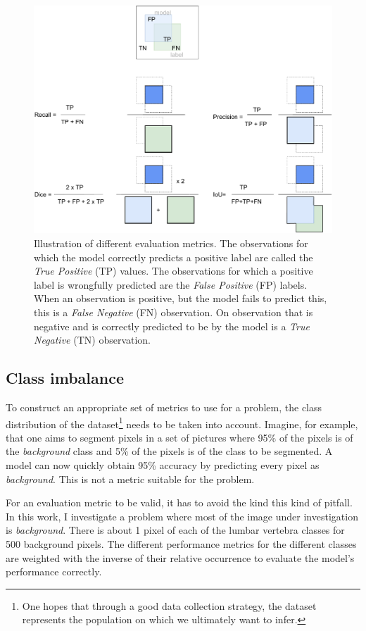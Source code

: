 \begin{figure}
    \centering
    \includegraphics[width=.95\textwidth]{images/Metrics.pdf}
    \caption{Illustration of different evaluation metrics. 
    The observations for which the model correctly predicts a positive label are called the \textit{True Positive} (TP) values.
    The observations for which a positive label is wrongfully predicted are the \textit{False Positive} (FP) labels. 
    When an observation is positive, but the model fails to predict this, this is a \textit{False Negative} (FN) observation.
    On observation that is negative and is correctly predicted to be by the model is a \textit{True Negative} (TN) observation.\label{fig:metrics}
    }
\end{figure}

\subsection{Class imbalance\label{sec:class_imbalance}}
\par{
    To construct an appropriate set of metrics to use for a problem, the class distribution of the dataset\footnote{
        One hopes that through a good data collection strategy, the dataset represents the population on which we ultimately want to infer.
        } needs to be taken into account.
    Imagine, for example, that one aims to segment pixels in a set of pictures where 95\% of the pixels is of the \textit{background} class and 5\% of the pixels is of the class to be segmented.
    A model can now quickly obtain 95\% accuracy by predicting every pixel as \textit{background}. This is not a metric suitable for the problem.
}
\par{
    For an evaluation metric to be valid, it has to avoid the kind this kind of pitfall.
    In this work, I investigate a problem where most of the image under investigation is \textit{background}. 
    There is about 1 pixel of each of the lumbar vertebra classes for 500 background pixels.
    The different performance metrics for the different classes are weighted with the inverse of their relative occurrence to evaluate the model's performance correctly.
}
\newpage
